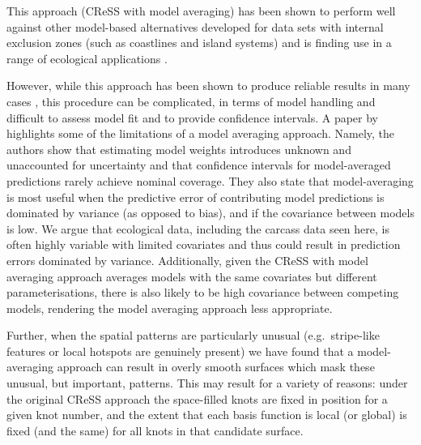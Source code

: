 \documentclass[letterpaper, 12pt]{interact}
\begin{document}
	This approach (CReSS with model averaging) has been shown to perform well against other model-based alternatives developed for data sets with internal exclusion zones (such as coastlines and island systems) and is finding use in a range of ecological applications \cite{russell2016, dunlop2017, harris2018}.
	
	However, while this approach  has been shown to produce reliable results in many cases \citep{scott2014}, this procedure can be complicated, in terms of model handling and difficult to assess model fit and to provide confidence intervals. A paper by \citet{dormann2018} highlights some of the limitations of a model averaging approach. Namely, the authors show that estimating model weights introduces unknown and unaccounted for uncertainty and that confidence intervals for model-averaged predictions rarely achieve nominal coverage. They also state that model-averaging is most useful when the predictive error of contributing model predictions is dominated by variance (as opposed to bias), and if the covariance between models is low. We argue that ecological data, including the carcass data seen here, is often highly variable with limited covariates and thus could result in prediction errors dominated by variance. Additionally, given the CReSS with model averaging approach averages models with the same covariates but different parameterisations, there is also likely to be high covariance between competing models, rendering the model averaging approach less appropriate.
	
	Further, when the spatial patterns are particularly unusual (e.g.~stripe-like features or local hotspots are genuinely present) we have found that a model-averaging approach can result in overly smooth surfaces which mask these unusual, but important, patterns. This may result for a variety of reasons: under the original CReSS approach the space-filled knots are fixed in position for a given knot number, and the extent that each basis function is local (or global) is fixed (and the same) for all knots in that candidate surface.
	
	
	
\end{document}
